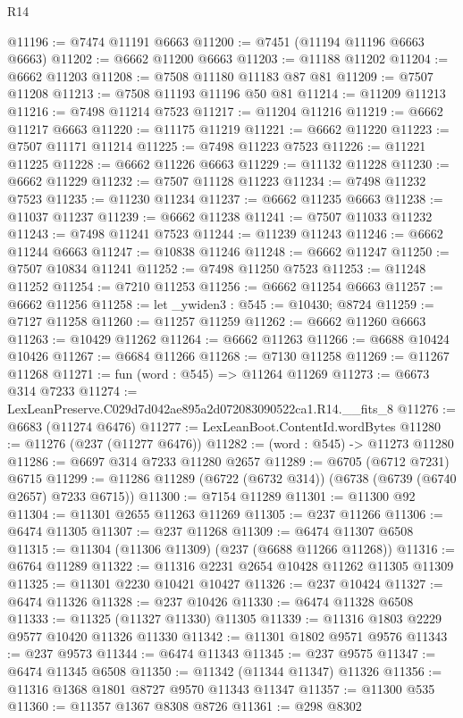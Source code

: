 \begin{lexlean}{R14}
\begin{coremodule}
@11196 := @7474 @11191 @6663
@11200 := @7451 (@11194 @11196 @6663 @6663)
@11202 := @6662 @11200 @6663
@11203 := @11188 @11202
@11204 := @6662 @11203
@11208 := @7508 @11180 @11183 @87 @81
@11209 := @7507 @11208
@11213 := @7508 @11193 @11196 @50 @81
@11214 := @11209 @11213
@11216 := @7498 @11214 @7523
@11217 := @11204 @11216
@11219 := @6662 @11217 @6663
@11220 := @11175 @11219
@11221 := @6662 @11220
@11223 := @7507 @11171 @11214
@11225 := @7498 @11223 @7523
@11226 := @11221 @11225
@11228 := @6662 @11226 @6663
@11229 := @11132 @11228
@11230 := @6662 @11229
@11232 := @7507 @11128 @11223
@11234 := @7498 @11232 @7523
@11235 := @11230 @11234
@11237 := @6662 @11235 @6663
@11238 := @11037 @11237
@11239 := @6662 @11238
@11241 := @7507 @11033 @11232
@11243 := @7498 @11241 @7523
@11244 := @11239 @11243
@11246 := @6662 @11244 @6663
@11247 := @10838 @11246
@11248 := @6662 @11247
@11250 := @7507 @10834 @11241
@11252 := @7498 @11250 @7523
@11253 := @11248 @11252
@11254 := @7210 @11253
@11256 := @6662 @11254 @6663
@11257 := @6662 @11256
@11258 := let _ywiden3 : @545 := @10430; @8724
@11259 := @7127 @11258
@11260 := @11257 @11259
@11262 := @6662 @11260 @6663
@11263 := @10429 @11262
@11264 := @6662 @11263
@11266 := @6688 @10424 @10426
@11267 := @6684 @11266
@11268 := @7130 @11258
@11269 := @11267 @11268
@11271 := fun (word : @545) => @11264 @11269
@11273 := @6673 @314 @7233
@11274 := LexLeanPreserve.C029d7d042ae895a2d072083090522ca1.R14.__fits_8
@11276 := @6683 (@11274 @6476)
@11277 := LexLeanBoot.ContentId.wordBytes
@11280 := @11276 (@237 (@11277 @6476))
@11282 := (word : @545) -> @11273 @11280
@11286 := @6697 @314 @7233 @11280 @2657
@11289 := @6705 (@6712 @7231) @6715
@11299 := @11286 @11289 (@6722 (@6732 @314)) (@6738 (@6739 (@6740 @2657) @7233 @6715))
@11300 := @7154 @11289
@11301 := @11300 @92
@11304 := @11301 @2655 @11263 @11269
@11305 := @237 @11266
@11306 := @6474 @11305
@11307 := @237 @11268
@11309 := @6474 @11307 @6508
@11315 := @11304 (@11306 @11309) (@237 (@6688 @11266 @11268))
@11316 := @6764 @11289
@11322 := @11316 @2231 @2654 @10428 @11262 @11305 @11309
@11325 := @11301 @2230 @10421 @10427
@11326 := @237 @10424
@11327 := @6474 @11326
@11328 := @237 @10426
@11330 := @6474 @11328 @6508
@11333 := @11325 (@11327 @11330) @11305
@11339 := @11316 @1803 @2229 @9577 @10420 @11326 @11330
@11342 := @11301 @1802 @9571 @9576
@11343 := @237 @9573
@11344 := @6474 @11343
@11345 := @237 @9575
@11347 := @6474 @11345 @6508
@11350 := @11342 (@11344 @11347) @11326
@11356 := @11316 @1368 @1801 @8727 @9570 @11343 @11347
@11357 := @11300 @535
@11360 := @11357 @1367 @8308 @8726
@11361 := @298 @8302

\end{coremodule}
\end{lexlean}
